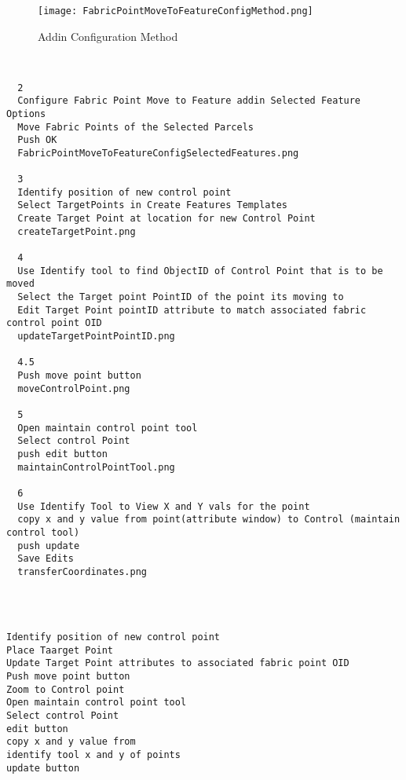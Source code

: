 \begin{figure}[h!]
\centering
    \texttt{[image: FabricPointMoveToFeatureConfigMethod.png]}
\caption{Addin Configuration Method}
\end{figure}
%
%
\clearpage
%
%
%


\begin{verbatim}


  2
  Configure Fabric Point Move to Feature addin Selected Feature Options
  Move Fabric Points of the Selected Parcels
  Push OK
  FabricPointMoveToFeatureConfigSelectedFeatures.png

  3
  Identify position of new control point
  Select TargetPoints in Create Features Templates
  Create Target Point at location for new Control Point
  createTargetPoint.png

  4
  Use Identify tool to find ObjectID of Control Point that is to be moved
  Select the Target point PointID of the point its moving to
  Edit Target Point pointID attribute to match associated fabric control point OID
  updateTargetPointPointID.png

  4.5
  Push move point button
  moveControlPoint.png

  5
  Open maintain control point tool
  Select control Point
  push edit button
  maintainControlPointTool.png

  6
  Use Identify Tool to View X and Y vals for the point
  copy x and y value from point(attribute window) to Control (maintain control tool)
  push update
  Save Edits
  transferCoordinates.png




Identify position of new control point
Place Taarget Point
Update Target Point attributes to associated fabric point OID
Push move point button
Zoom to Control point
Open maintain control point tool
Select control Point
edit button
copy x and y value from
identify tool x and y of points
update button

\end{verbatim}

